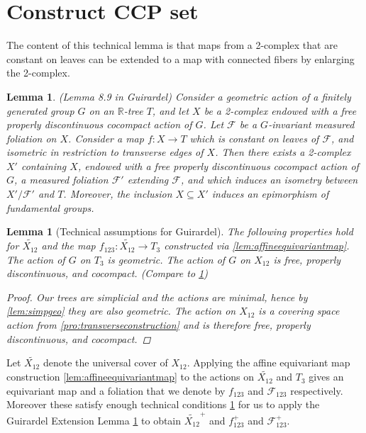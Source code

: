 \documentclass[12pt,parskip=full]{report}
\theoremstyle{plain}
\newtheorem{lem}[thm]{Lemma}
\theoremstyle{definition}
\begin{document}
\section{Construct CCP set}

        The content of this technical lemma is that maps from a 2-complex that are constant on leaves can be extended to a map with connected fibers by enlarging the 2-complex.
        \begin{lem}
            \label{lem:guirardel-extension}
            (Lemma 8.9 in Guirardel)
            Consider a geometric action of a finitely generated group \(G\) on an \(\mathbb{R}\)-tree \(T\), and let \(X\) be a 2-complex endowed with a free properly discontinuous cocompact action of \(G\). Let \(\mathscr{F}\) be a \(G\)-invariant measured foliation on \(X\). Consider a map \(f: X \to T\) which is constant on leaves of \(\mathscr{F}\), and isometric in restriction to transverse edges of \(X\). Then there exists a 2-complex \( X'\) containing \(X\), endowed with a free properly discontinuous cocompact action of \(G\), a measured foliation \(\mathscr{F} '\) extending \(\mathscr{F}\), and which induces an isometry between \(X'/ \mathscr{F}'\) and \(T\). Moreover, the inclusion \(X \subseteq X'\) induces an epimorphism of fundamental groups.
        \end{lem}
        
\begin{lem}
[Technical assumptions for Guirardel]
    \label{lem:technicalconditions}
 The following properties hold for \(\widetilde{ X_{12} }\) and the map \(f_{123}: \widetilde{ X_{12}}\to T_3\) constructed via  \ref{lem:affineequivariantmap}. The action of \(G\) on \(T_3\) is geometric. The action of \(G\) on \(X_{12}\) is free, properly discontinuous, and cocompact. (Compare to \ref{lem:guirardel-extension})
    
    \begin{proof}
        Our trees are simplicial and the actions are minimal, hence by \ref{lem:simpgeo} they are also geometric. The action on \(X_{12}\) is a covering space action from \ref{pro:transverseconstruction} and is therefore free, properly discontinuous, and cocompact.
    \end{proof}
\end{lem}

        Let \(\widetilde {X_{12}}\) denote the universal cover of \(X_{12}\).  Applying the affine equivariant map construction \ref{lem:affineequivariantmap} to the actions on \(\widetilde {X_{12}}\) and \(T_{3}\) gives an equivariant  map and a foliation that we denote by \(f_{123}\) and \(\mathscr{F}_{123}\) respectively. Moreover these satisfy enough technical conditions 
        \ref{lem:technicalconditions} for us to apply the Guirardel Extension Lemma \ref{lem:guirardel-extension} to obtain \(\widetilde{X_{12}}^{+}\) and \(f_{123}^{+}\) and \(\mathscr{F}_{123}^{+}\).
\end{document}
